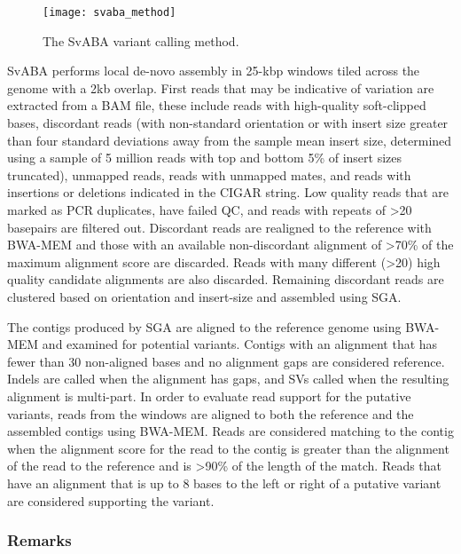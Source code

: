 \begin{figure}[H]
    \texttt{[image: svaba\_method]}
    \centering
    \caption {The SvABA variant calling method\autocite{wala2018svaba}.}
    \label{fig:svaba_method}
\end{figure}

SvABA performs local de-novo assembly in 25-kbp windows tiled across the genome with a 2kb overlap. First reads that may be indicative of variation are extracted from a BAM file, these include reads with high-quality soft-clipped bases, discordant reads (with non-standard orientation or with insert size greater than four standard deviations away from the sample mean insert size, determined using a sample of 5 million reads with top and bottom 5\% of insert sizes truncated), unmapped reads, reads with unmapped mates, and reads with insertions or deletions indicated in the CIGAR string. Low quality reads that are marked as PCR duplicates, have failed QC, and reads with repeats of >20 basepairs are filtered out. Discordant reads are realigned to the reference with BWA-MEM and those with an available non-discordant alignment of >70\% of the maximum alignment score are discarded. Reads with many different (>20) high quality candidate alignments are also discarded. Remaining discordant reads are clustered based on orientation and insert-size and assembled using SGA.

The contigs produced by SGA are aligned to the reference genome using BWA-MEM and examined for potential variants. Contigs with an alignment that has fewer than 30 non-aligned bases and no alignment gaps are considered reference. Indels are called when the alignment has gaps, and SVs called when the resulting alignment is multi-part. In order to evaluate read support for the putative variants, reads from the windows are aligned to both the reference and the assembled contigs using BWA-MEM. Reads are considered matching to the contig when the alignment score for the read to the contig is greater than the alignment of the read to the reference and is >90\% of the length of the match. Reads that have an alignment that is up to 8 bases to the left or right of a putative variant are considered supporting the variant.

\subsubsection{Remarks}

